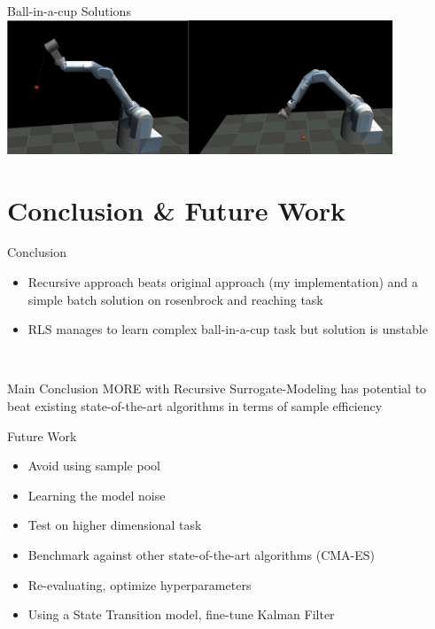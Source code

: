 \documentclass[navbarinfooter, 12pt]{sdqbeamer}
\begin{document}
\begin{frame}{Ball-in-a-cup Solutions}
  \centering
  \includegraphics[height=4cm]{figures/cup_solution.png}
\end{frame}


\section{Conclusion \& Future Work}
\begin{frame}{Conclusion}
  \begin{itemize}
  \item Recursive approach beats original approach (my implementation)
    and a simple batch solution on rosenbrock and reaching task
  \item RLS manages to learn complex ball-in-a-cup task but solution is
    unstable
  \end{itemize}

  $~$

  \begin{block}{Main Conclusion}
    MORE with Recursive Surrogate-Modeling has potential to beat existing
    state-of-the-art algorithms in terms of sample efficiency
  \end{block}
\end{frame}


\begin{frame}{Future Work}
  \begin{itemize}
    \item Avoid using sample pool
    \item Learning the model noise
    \item Test on higher dimensional task
    \item Benchmark against other state-of-the-art algorithms (CMA-ES)
    \item Re-evaluating, optimize hyperparameters
    \item Using a State Transition model, fine-tune Kalman Filter
  \end{itemize}
\end{frame}
\end{document}
